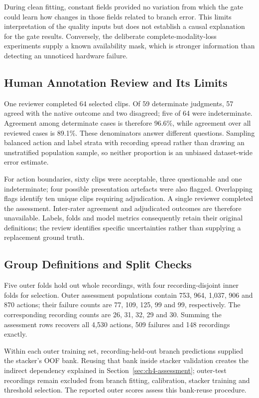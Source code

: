 During clean fitting, constant fields provided no variation from which the gate could
learn how changes in those fields related to branch error. This limits interpretation of
the quality inputs but does not establish a causal explanation for the gate results.
Conversely, the deliberate complete-modality-loss experiments supply a known availability
mask, which is stronger information than detecting an unnoticed hardware failure.

\subsection{Human Annotation Review and Its Limits}
One reviewer completed 64 selected clips. Of 59 determinate judgments, 57 agreed with
the native outcome and two disagreed; five of 64 were indeterminate. Agreement among
determinate cases is therefore 96.6\%, while agreement over all reviewed cases is
89.1\%. These denominators answer different questions. Sampling balanced action and
label strata with recording spread rather than drawing an unstratified population
sample, so neither proportion is an unbiased dataset-wide error estimate.

For action boundaries, sixty clips were acceptable, three questionable and one
indeterminate; four possible presentation artefacts were also flagged. Overlapping flags
identify ten unique clips requiring adjudication. A single reviewer completed the
assessment. Inter-rater agreement and adjudicated outcomes are therefore unavailable.
Labels, folds and model metrics consequently retain their original definitions; the
review identifies specific uncertainties rather than supplying a replacement ground
truth.

\subsection{Group Definitions and Split Checks}
Five outer folds hold out whole recordings, with four recording-disjoint inner folds for
selection. Outer assessment populations contain 753, 964, 1,037, 906 and 870 actions;
their failure counts are 77, 109, 125, 99 and 99, respectively. The corresponding
recording counts are 26, 31, 32, 29 and 30. Summing the assessment rows recovers all
4,530 actions, 509 failures and 148 recordings exactly.

Within each outer training set, recording-held-out branch predictions supplied the
stacker's OOF bank. Reusing that bank inside stacker validation creates the indirect
dependency explained in Section~\ref{sec:ch4-assessment}; outer-test recordings remain
excluded from branch fitting, calibration, stacker training and threshold selection.
The reported outer scores assess this bank-reuse procedure.

